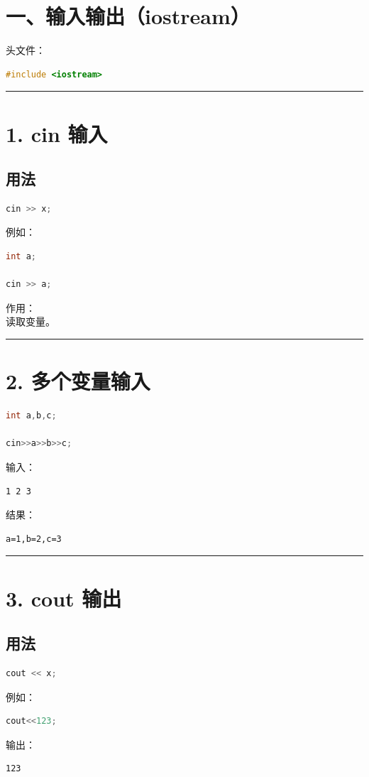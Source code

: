 \documentclass[10pt,twocolumn]{extarticle}
\begin{document}
\section{一、输入输出（iostream）}

头文件：
\begin{lstlisting}[language=C++]
#include <iostream>
\end{lstlisting}

\noindent\rule{\linewidth}{0.4pt}

\section{1. cin 输入}

\subsection{用法}
\begin{lstlisting}[language=C++]
cin >> x;
\end{lstlisting}
例如：
\begin{lstlisting}[language=C++]
int a;

cin >> a;
\end{lstlisting}
作用：\\
读取变量。

\noindent\rule{\linewidth}{0.4pt}

\section{2. 多个变量输入}
\begin{lstlisting}[language=C++]
int a,b,c;

cin>>a>>b>>c;
\end{lstlisting}
输入：
\begin{lstlisting}
1 2 3
\end{lstlisting}
结果：
\begin{lstlisting}
a=1,b=2,c=3
\end{lstlisting}

\noindent\rule{\linewidth}{0.4pt}

\section{3. cout 输出}

\subsection{用法}
\begin{lstlisting}[language=C++]
cout << x;
\end{lstlisting}
例如：
\begin{lstlisting}[language=C++]
cout<<123;
\end{lstlisting}
输出：
\begin{lstlisting}
123
\end{lstlisting}
\end{document}
